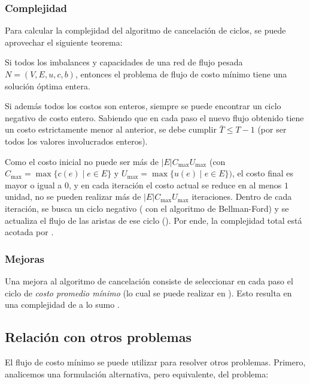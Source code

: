 \subsubsection{Complejidad}

Para calcular la complejidad del algoritmo de cancelación de ciclos, se puede aprovechar el siguiente teorema:

\begin{theorem*}
    Si todos los imbalances y capacidades de una red de flujo pesada $N = (V, E, u, c, b)$, entonces el problema de flujo de costo mínimo tiene una solución óptima entera.
\end{theorem*}

Si además todos los costos son enteros, siempre se puede encontrar un ciclo negativo de costo entero. Sabiendo que en cada paso el nuevo flujo obtenido tiene un costo estrictamente menor al anterior, se debe cumplir $\bar{T} \leq T - 1$ (por ser todos los valores involucrados enteros).

Como el costo inicial no puede ser más de $|E| C_{\max} U_{\max}$ (con $C_{\max} = \max{\{c(e) \mid e \in E\}}$ y $U_{\max} = \max{\{u(e) \mid e \in E\}})$, el costo final es mayor o igual a $0$, y en cada iteración el costo actual se reduce en al menos $1$ unidad, no se pueden realizar más de $|E| C_{\max} U_{\max}$ iteraciones. Dentro de cada iteración, se busca un ciclo negativo ( con el algoritmo de Bellman-Ford) y se actualiza el flujo de las aristas de ese ciclo (). Por ende, la complejidad total está acotada por .

\subsubsection{Mejoras}

Una mejora al algoritmo de cancelación consiste de seleccionar en cada paso el ciclo de \textit{costo promedio mínimo} (lo cual se puede realizar en ). Esto resulta en una complejidad de a lo sumo .

\subsection{Relación con otros problemas}

El flujo de costo mínimo se puede utilizar para resolver otros problemas. Primero, analicemos una formulación alternativa, pero equivalente, del problema:

